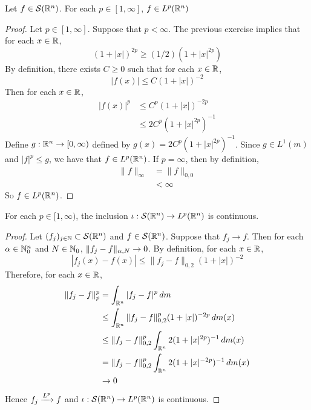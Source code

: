 \documentclass{book}
\begin{document}
	\begin{ex}
		Let $f \in \mathcal{S}(\mathbb{R}^n)$. For each $p \in [1, \infty]$, $f \in  L^p(\mathbb{R}^n)$
	\end{ex}

	\begin{proof}
		Let $p \in [1, \infty]$. Suppose that $p < \infty$. The previous exercise implies that for each $x \in \mathbb{R}$, 
		$$(1 + |x|)^{2p} \geq (1/2) (1 + |x|^{2p})$$
		By definition, there exists $C \geq 0$ such that for each $x \in \mathbb{R}$, 
		$$|f(x)| \leq C(1+|x|)^{-2} $$
		Then for each $x \in \mathbb{R}$,
		\begin{align*}
			|f(x)|^p 
			& \leq C^p(1+|x|)^{-2p} \\
			& \leq 2C^p(1+|x|^{2p})^{-1}
		\end{align*}
		Define $g:\mathbb{R}^n \rightarrow [0,\infty)$ defined by $g(x) = 2C^{p}(1+|x|^{2p})^{-1}$. Since $g \in L^1(m)$ and $|f|^p \leq g$, we have that $f \in L^p(\mathbb{R}^n)$. If $p = \infty$, then by definition, 
		\begin{align*}
			\|f\|_\infty 
			& = \|f\|_{0,0} \\
			& < \infty 
		\end{align*}
		So $f \in L^p(\mathbb{R}^n)$. 
	\end{proof}

	\begin{ex}
		For each $p \in [1, \infty)$, the inclusion $\iota: \mathcal{S}(\mathbb{R}^n) \rightarrow L^p(\mathbb{R}^n)$ is continuous. 
	\end{ex}

	\begin{proof}
		Let $(f_j)_{j \in \mathbb{N}} \subset \mathcal{S}(\mathbb{R}^n)$ and $f \in \mathcal{S}(\mathbb{R}^n)$. Suppose that $f_j \rightarrow f$. Then for each $\alpha \in \mathbb{N}_0^n$ and $N \in \mathbb{N}_0$, $\|f_j -f \|_{\alpha, N} \rightarrow 0$. By definition, for each $x \in \mathbb{R}$, 
		$$|f_j(x) - f(x)| \leq \|f_j - f\|_{0, 2} (1 + |x|)^{-2}$$
		Therefore, for each $x \in \mathbb{R}$, 
		\begin{align*}
			\|f_j - f\|_{p}^p 
			& = \int_{\mathbb{R}^n} |f_j - f|^p \, d m \\
			& \leq \int_{\mathbb{R}^n} \|f_j - f\|_{0, 2}^p (1 + |x|)^{-2p} \, d m(x) \\
			& \leq \|f_j - f\|_{0, 2}^p \int_{\mathbb{R}^n}  2(1 + |x|^{2p})^{-1} \, d m(x) \\
			& = \|f_j - f\|_{0, 2}^p \int_{\mathbb{R}^n}  2(1 + |x|^{-2p})^{-1} \, d m(x) \\
			& \rightarrow 0
		\end{align*}
		Hence $f_j \xrightarrow{L^p} f$ and $\iota: \mathcal{S}(\mathbb{R}^n) \rightarrow L^p(\mathbb{R}^n)$ is continuous.
	\end{proof}
\end{document}

